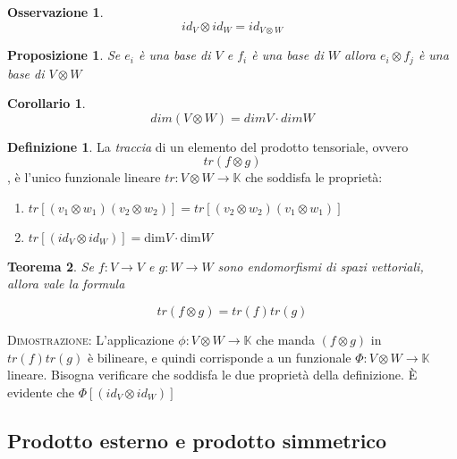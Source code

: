\documentclass[11pt]{article}
\theoremstyle{plain}
\newtheorem{thm}{Teorema}[section]
\newtheorem{prop}[thm]{Proposizione}
\newtheorem*{cor}{Corollario}
\theoremstyle{definition}
\newtheorem{defn}{Definizione}[section]
\newtheorem*{rem}{Osservazione}
\theoremstyle{remark}
\newcommand{\K}{\mathbb{K}}
\begin{document}
\begin{rem}

\[ id_V \otimes id_W = id_{V\otimes W}\]
\end{rem}




\begin{prop}

Se $e_i$ è una base di $V$ e $f_i$ è una base di $W$ allora $e_i \otimes f_j$ è una base di $V \otimes W$
\end{prop}


\begin{cor}
\[dim(V \otimes W) = dim V \cdot dim W \]

\end{cor}

















\begin{defn}
La \emph{traccia} di un elemento del prodotto tensoriale, ovvero 
\[ tr(f\otimes g)\], 
è l'unico funzionale lineare $tr: V \otimes W \to \K$ che soddisfa le proprietà:
\begin{enumerate}
\item $tr[ (v_1 \otimes w_1) (v_2 \otimes w_2) ] = tr[ (v_2 \otimes w_2) (v_1 \otimes w_1) ] $ 
\item $tr[ (id_V \otimes id_W)  ]  = \mbox{dim} V \cdot \mbox{dim} W $
\end{enumerate}
\end{defn}


\begin{thm}
Se $f:V\to V$ e $g:W\to W$ sono endomorfismi di spazi vettoriali, allora vale la formula

\[tr(f\otimes g) = tr(f) tr(g)  \]

\end{thm}

\textsc{Dimostrazione:} L'applicazione $\phi: V \otimes W \to \K$ che manda $(f\otimes g)$ in $tr(f) tr(g)$ è bilineare, e quindi corrisponde a un funzionale $\Phi: V \otimes W \to \K$ lineare. Bisogna verificare che soddisfa le due proprietà della definizione.  È evidente che $\Phi[ (id_V \otimes id_W)  ]  $ 


\subsection{Prodotto esterno e prodotto simmetrico}
\end{document}
